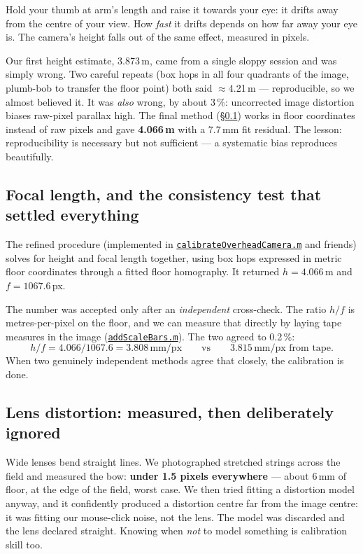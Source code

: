 \documentclass[11pt,a4paper]{article}
\newcommand{\gh}[2]{\href{https://github.com/AdershM-2/UWB_3/blob/main/#1}{\texttt{#2}}}
\begin{document}
\begin{plainwords}
Hold your thumb at arm's length and raise it towards your eye: it drifts away from
the centre of your view. How \emph{fast} it drifts depends on how far away your eye
is. The camera's height falls out of the same effect, measured in pixels.
\end{plainwords}

\begin{pitfall}
Our first height estimate, 3.873\,m, came from a single sloppy session and was
simply wrong. Two careful repeats (box hops in all four quadrants of the image,
plumb-bob to transfer the floor point) both said $\approx$4.21\,m --- reproducible,
so we almost believed it. It was \emph{also} wrong, by about 3\,\%: uncorrected
image distortion biases raw-pixel parallax high. The final method
(\S\ref{sec:stagec}) works in floor coordinates instead of raw pixels and gave
\textbf{4.066\,m} with a 7.7\,mm fit residual. The lesson: reproducibility is
necessary but not sufficient --- a systematic bias reproduces beautifully.
\end{pitfall}

\subsection{Focal length, and the consistency test that settled everything}
\label{sec:stagec}

The refined procedure (implemented in
\gh{matlab/vision/calibrateOverheadCamera.m}{calibrateOverheadCamera.m} and
friends) solves for height and focal length together, using box hops expressed in
metric floor coordinates through a fitted floor homography. It returned
$h = 4.066$\,m and $f = 1067.6$\,px.

The number was accepted only after an \emph{independent} cross-check. The ratio
$h/f$ is metres-per-pixel on the floor, and we can measure that directly by laying
tape measures in the image (\gh{matlab/vision/addScaleBars.m}{addScaleBars.m}).
The two agreed to 0.2\,\%:
\[
h/f = 4.066/1067.6 = 3.808\,\text{mm/px}
\qquad\text{vs}\qquad
3.815\,\text{mm/px from tape}.
\]
When two genuinely independent methods agree that closely, the calibration is done.

\subsection{Lens distortion: measured, then deliberately ignored}

Wide lenses bend straight lines. We photographed stretched strings across the field
and measured the bow: \textbf{under 1.5 pixels everywhere} --- about 6\,mm of floor,
at the edge of the field, worst case. We then tried fitting a distortion model
anyway, and it confidently produced a distortion centre far from the image centre:
it was fitting our mouse-click noise, not the lens. The model was discarded and the
lens declared straight. Knowing when \emph{not} to model something is calibration
skill too.
\end{document}
